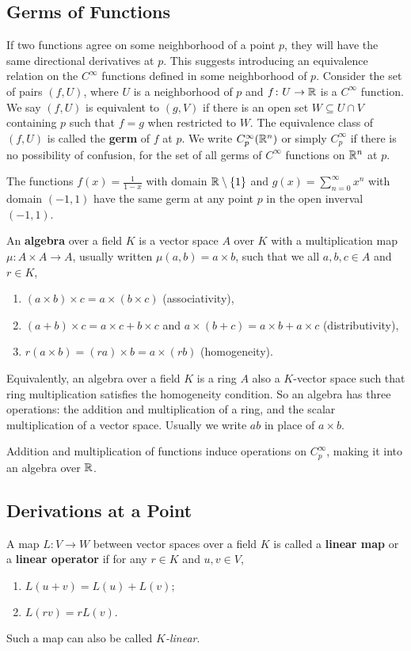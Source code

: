     \subsection{Germs of Functions}
    If two functions agree on some neighborhood of a point $p$, they will have the same directional derivatives at $p$. This suggests introducing an equivalence relation on the $C^{\infty}$ functions defined in some neighborhood of $p$. Consider the set of pairs $(f,U)$, where $U$ is a neighborhood of $p$ and $f \colon U \to \mathbb{R}$ is a $C^{\infty}$ function. We say $(f,U)$ is equivalent to $(g,V)$ if there is an open set  $W\subseteq U\cap V$ containing $p$ such that $f=g$ when restricted to $W$. The equivalence class of $(f,U)$ is called the \textbf{germ} of $f$ at $p$. We write $C_p ^{\infty}(\mathbb{R}^n )$ or simply $C_p^{\infty}$ if there is no possibility of confusion, for the set of all germs of $C^{\infty}$ functions on $\mathbb{R}^n $ at $p$.
    \begin{example}
        The functions $f(x)=\frac{1}{1-x}$ with domain $\mathbb{R} \setminus \{1\} $ and $g(x)=\sum_{n=0}^{\infty} x^n$ with domain $(-1,1)$ have the same germ at any point $p$ in the open inverval $(-1,1)$.
    \end{example}
    An \textbf{algebra} over a field $K$ is a vector space $A$ over $K$ with a multiplication map $\mu \colon A\times A \to A$, usually written $\mu(a,b)=a\times b$, such that we all $a,b,c\in A$ and $r\in K$, 
    \begin{enumerate}[label=(\roman*)]
        \item $(a\times b)\times c=a\times (b\times c)$ (associativity),
        \item $(a+b)\times c=a\times c+b\times c$ and $a\times (b+c)=a\times b+a\times c$ (distributivity),
        \item $r(a\times b)=(ra)\times b=a\times (rb)$ (homogeneity).
    \end{enumerate}
    Equivalently, an algebra over a field $K$ is a ring $A$ also a $K$-vector space such that ring multiplication satisfies the homogeneity condition. So an algebra has three operations: the addition and multiplication of a ring, and the scalar multiplication of a vector space. Usually we write $ab$ in place of $a\times b$.

    Addition and multiplication of functions induce operations on $C_p^{\infty}$, making it into an algebra over $\mathbb{R}$.

    \subsection{Derivations at a Point}
    A map $L \colon V \to W$ between vector spaces over a field $K$ is called a \textbf{linear map} or a \textbf{linear operator} if for any $r\in K$ and $u,v\in V$,
    \begin{enumerate}[label=(\roman*)]
        \item $L(u+v)=L(u)+L(v);$
        \item $L(rv)=rL(v).$
    \end{enumerate}
    Such a map can also be called $K$\emph{-linear}.
